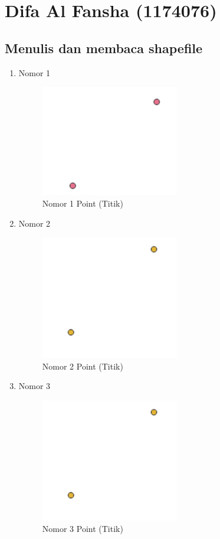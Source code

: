 \section{Difa Al Fansha (1174076)}
\subsection{Menulis dan membaca shapefile}
\begin{enumerate}
\item Nomor 1
	
	\begin{figure}[H]
	\includegraphics[width=6cm]{figures/Tugas2/1174076/soal1.png}
		\centering
		\caption{Nomor 1 Point (Titik)}
	\end{figure}
	
	\item Nomor 2
	
	\begin{figure}[H]
		\includegraphics[width=6cm]{figures/Tugas2/1174076/soal2.png}
		\centering
		\caption{Nomor 2 Point (Titik)}
	\end{figure}
	
	\item Nomor 3
	
	\begin{figure}[H]
		\includegraphics[width=6cm]{figures/Tugas2/1174076/soal3.png}
		\centering
		\caption{Nomor 3 Point (Titik)}
	\end{figure}
	

\end{enumerate}

